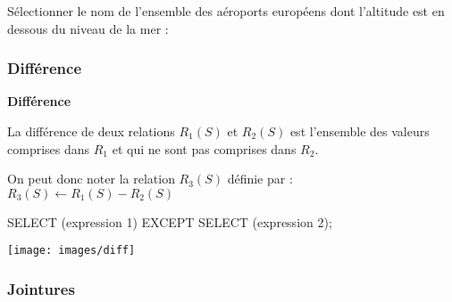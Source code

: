 \documentclass[10pt]{article}
\newif\ifprofvar
\begin{document}
\begin{exemple}
Sélectionner le nom de l'ensemble des aéroports européens dont l'altitude est en dessous du niveau de la mer :
\ifprofvar
$$
\pi_{\text{name}}\left(\sigma_{\text{continent}=''EU''}(\text{airports}) \cap \sigma_{\text{elevation\_ft}\leq0}(\text{airports}) \right)
$$
\begin{envsql}
\begin{sql}
SELECT name FROM airports WHERE continent=''EU''
    INTERSECT SELECT name FROM airports WHERE elevation_ft<=0;
\end{sql}
\end{envsql}
\else
\vspace{4cm}
\fi

\end{exemple}


\subsubsection{Différence}
\begin{defi}
\begin{minipage}[c]{.75\linewidth}
\textbf{Différence}

La différence de deux relations $R_1(S)$ et $R_2(S)$ est l'ensemble des valeurs comprises dans $R_1$ et qui ne sont pas comprises dans $R_2$. 

On peut donc noter la relation $R_3(S)$ définie par : $R_3(S)\leftarrow R_1(S)-R_2(S)$

\begin{envsql}
\begin{sql}
SELECT  (expression 1) EXCEPT SELECT (expression 2);
\end{sql}
\end{envsql}

\end{minipage}\hfill
\begin{minipage}[c]{.2\linewidth}
\begin{center}
\texttt{[image: images/diff]}
\end{center}
\end{minipage}
\end{defi}

\subsubsection{Jointures}
\end{document}

